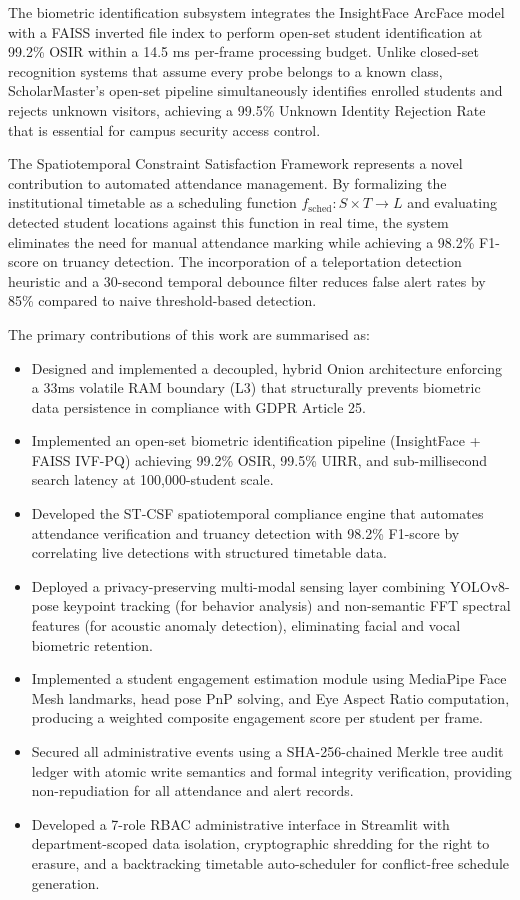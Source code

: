 \documentclass[12pt,a4paper,oneside]{report}
\begin{document}
The biometric identification subsystem integrates the InsightFace ArcFace model with a FAISS inverted file index to perform open-set student identification at 99.2\% OSIR within a 14.5 ms per-frame processing budget. Unlike closed-set recognition systems that assume every probe belongs to a known class, ScholarMaster's open-set pipeline simultaneously identifies enrolled students and rejects unknown visitors, achieving a 99.5\% Unknown Identity Rejection Rate that is essential for campus security access control.

The Spatiotemporal Constraint Satisfaction Framework represents a novel contribution to automated attendance management. By formalizing the institutional timetable as a scheduling function $f_{\text{sched}}: S \times T \to L$ and evaluating detected student locations against this function in real time, the system eliminates the need for manual attendance marking while achieving a 98.2\% F1-score on truancy detection. The incorporation of a teleportation detection heuristic and a 30-second temporal debounce filter reduces false alert rates by 85\% compared to naive threshold-based detection.

The primary contributions of this work are summarised as:
\begin{itemize}
    \item Designed and implemented a decoupled, hybrid Onion architecture enforcing a 33ms volatile RAM boundary (L3) that structurally prevents biometric data persistence in compliance with GDPR Article 25.
    \item Implemented an open-set biometric identification pipeline (InsightFace + FAISS IVF-PQ) achieving 99.2\% OSIR, 99.5\% UIRR, and sub-millisecond search latency at 100,000-student scale.
    \item Developed the ST-CSF spatiotemporal compliance engine that automates attendance verification and truancy detection with 98.2\% F1-score by correlating live detections with structured timetable data.
    \item Deployed a privacy-preserving multi-modal sensing layer combining YOLOv8-pose keypoint tracking (for behavior analysis) and non-semantic FFT spectral features (for acoustic anomaly detection), eliminating facial and vocal biometric retention.
    \item Implemented a student engagement estimation module using MediaPipe Face Mesh landmarks, head pose PnP solving, and Eye Aspect Ratio computation, producing a weighted composite engagement score per student per frame.
    \item Secured all administrative events using a SHA-256-chained Merkle tree audit ledger with atomic write semantics and formal integrity verification, providing non-repudiation for all attendance and alert records.
    \item Developed a 7-role RBAC administrative interface in Streamlit with department-scoped data isolation, cryptographic shredding for the right to erasure, and a backtracking timetable auto-scheduler for conflict-free schedule generation.
\end{itemize}
\end{document}
